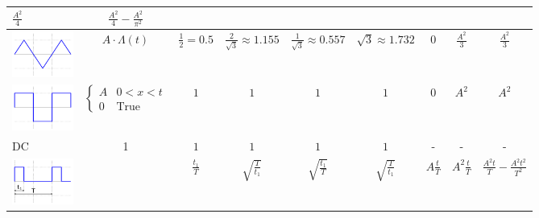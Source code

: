 \begin{table}
\begin{tabular}{|l|c|c|c|c|c|c|c|c|}
			$\frac{A^2}{4}$ & $\frac{A^2}{4}-\frac{A^2}{\pi^2}$
			\\
			\hline
			\includegraphics[width=2cm]{images/table_triangle_wave.png} &
			$A\cdot\Lambda(t)$ &
			$\frac{1}{2}= 0.5$ &
			$\frac{2}{\sqrt{3}}\approx 1.155$ &
			$\frac{1}{\sqrt{3}}
			\approx 0.557$ &
			$\sqrt{3} \approx 1.732$ &
			$0$ &
			$\frac{A^2}{3}$ &
			$\frac{A^2}{3}$ \\
			\hline	
			\includegraphics[width=2cm]{images/table_square_wave.png} &
			$\begin{cases} A & 0<x<t \\ 0 & \text{True}\end{cases}$ &
			$1$ &
			$1$ &
			$1$ &
			$1$ &
			$0$ &
			$A^2$ &
			$A^2$ \\
			\hline	
			DC&
			1&
			$1$ &
			$1$ &
			$1$ &
			$1$  &
			-&
			-&
			-\\
			\hline	
			\includegraphics[width=2cm]{images/table_pulse_wide_wave.png} &
			&
			$\frac{t_1}{T}$ & $\sqrt{\frac{T}{t_1}}$ & $\sqrt{\frac{t_1}{T}}$ & $\sqrt{\frac{T}{t_1}}$ &
			$A\frac{t}{T}$ &
			$A^2\frac{t}{T}$ &
			$\frac{A^2t}{T}-\frac{A^2t^2}{T^2}$\\
			\hline
		\end{tabular}
\end{table}
\clearpage
\newpage